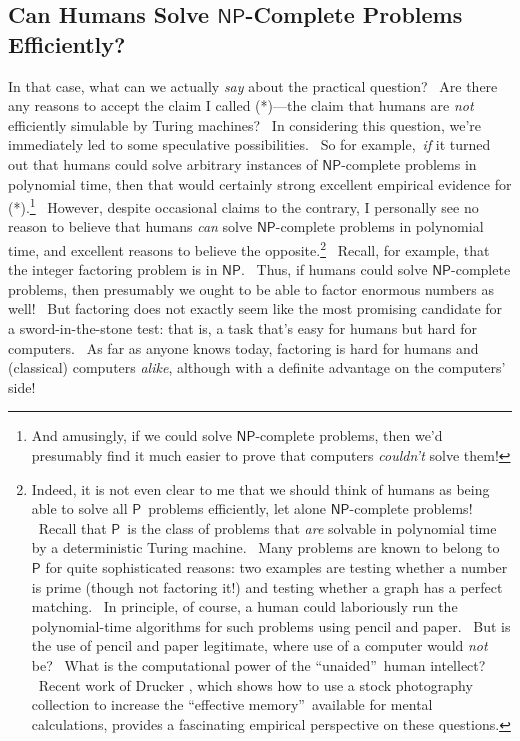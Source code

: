 \documentclass[11pt,onecolumn]{article}%
\begin{document}
\subsection{Can Humans Solve $\mathsf{NP}$-Complete Problems
Efficiently?\label{HUMANS}}

In that case, what can we actually \textit{say} about the practical question?
\ Are there any reasons to accept the claim I called (*)---the claim that
humans are \textit{not} efficiently simulable by Turing machines? \ In
considering this question, we're immediately led to some speculative
possibilities. \ So for example,\ \textit{if} it turned out that humans could
solve arbitrary instances of $\mathsf{NP}$-complete problems in polynomial
time, then that would certainly strong excellent empirical evidence for
(*).\footnote{And amusingly, if we could solve $\mathsf{NP}$-complete
problems, then we'd presumably find it much easier to prove that computers
\textit{couldn't} solve them!} \ However, despite occasional claims to the
contrary, I personally see no reason to believe that humans \textit{can} solve
$\mathsf{NP}$-complete problems in polynomial time, and excellent reasons to
believe the opposite.\footnote{Indeed, it is not even clear to me that we
should think of humans as being able to solve all $\mathsf{P}$\ problems
efficiently, let alone $\mathsf{NP}$-complete problems! \ Recall that
$\mathsf{P}$\ is the class of problems that \textit{are} solvable in
polynomial time by a deterministic Turing machine. \ Many problems are known
to belong to $\mathsf{P}$ for quite sophisticated reasons: two examples are
testing whether a number is prime (though not factoring it!) \cite{aks} and
testing whether a graph has a perfect matching. \ In principle, of course, a
human could laboriously run the polynomial-time algorithms for such problems
using pencil and paper. \ But is the use of pencil and paper legitimate, where
use of a computer would \textit{not} be? \ What is the computational power of
the \textquotedblleft unaided\textquotedblright\ human intellect? \ Recent
work of Drucker \cite{drucker}, which shows how to use a stock photography
collection to increase the \textquotedblleft effective
memory\textquotedblright\ available for mental calculations, provides a
fascinating empirical perspective on these questions.} \ Recall, for example,
that the integer factoring problem is in $\mathsf{NP}$. \ Thus, if humans
could solve $\mathsf{NP}$-complete problems, then presumably we ought to be
able to factor enormous numbers as well! \ But factoring does not exactly seem
like the most promising candidate for a sword-in-the-stone test: that is, a
task that's easy for humans but hard for computers. \ As far as anyone knows
today, factoring is hard for humans and (classical) computers\textit{ alike},
although with a definite advantage on the computers' side!
\end{document}
